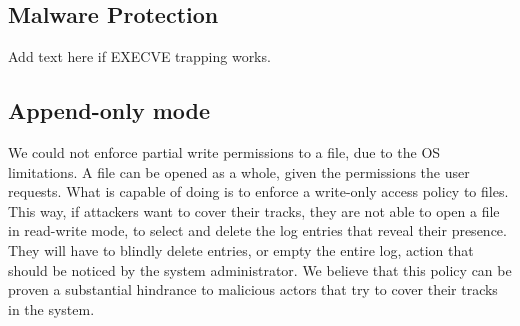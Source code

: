 %
%
%

\subsection{Malware Protection}

Add text here if EXECVE trapping works.

\subsection{Append-only mode}

\par We could not enforce partial write permissions to a file, due to the \ac{OS} limitations. A file can be opened as a whole, given the permissions the user requests. What  is capable of doing is to enforce a write-only access policy to files. This way, if attackers want to cover their tracks, they are not able to open a file in read-write mode, to select and delete the log entries that reveal their presence. They will have to blindly delete entries, or empty the entire log, action that should be noticed by the system administrator. We believe that this policy can be proven a substantial hindrance to malicious actors that try to cover their tracks in the system.

